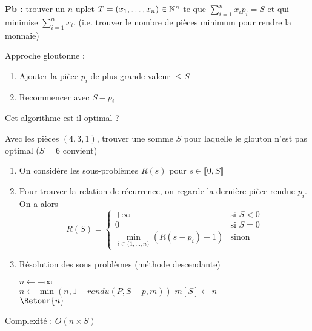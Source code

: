 \textbf{Pb :} trouver un $n$-uplet $T = (x_1,  \dots, x_n) \in \mathbb{N}^n$ te que $\sum\limits_{i = 1}^n x_i p_i = S$ et qui minimise $\sum\limits_{i = 1}^n x_i $.
(i.e. trouver le nombre de pièces minimum pour rendre la monnaie)

\begin{algo}
	Approche gloutonne : \begin{enumerate}
		\item Ajouter la pièce $p_i$ de plus grande valeur $\leq S$
		\item Recommencer avec $S -p_i$
	\end{enumerate}
\end{algo}

Cet algorithme est-il optimal ?
\begin{exercise}
	Avec les pièces $(4, 3, 1)$, trouver une somme $S$ pour laquelle le glouton n'est pas optimal ($S = 6$ convient)
\end{exercise}

\begin{algo}
	\enspace
	\begin{enumerate}
		\item On considère les sous-problèmes $R(s)$ pour $s \in \llbracket 0, S \rrbracket$
		\item Pour trouver la relation de récurrence, on regarde la dernière pièce rendue $p_i$. On a alors $$R(S) = \left\{ \begin{array}{ll}
			+\infty & \text{si } S<0\\
			0 & \text{si } S = 0\\
			\min\limits_{i\in \{1, \dots, n\}} (R(s-p_i)+1) &\text{sinon}
		\end{array}\right.$$
		\item Résolution des sous problèmes (méthode descendante)\\
		\begin{algorithm}[H]
			\caption{$rendu(P, S, m)$}
				{}
				{}
			$n \gets +\infty$\\
				{$n \gets \min(n, 1+rendu(P, S-p, m))$}
			$m[S] \gets n$\\
			$\Retour{n}$
		\end{algorithm}
	\end{enumerate}
	Complexité : $O(n\times S)$
\end{algo}

